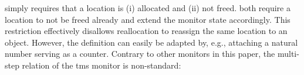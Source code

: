 \documentclass[dvipsnames]{llncs}
\begin{document}
\begin{center}\small
  $\;$\\
\end{center}
% 
 simply requires that a location is (i) allocated and (ii) not freed.
 both require a location to not be freed already and extend the monitor state accordingly.
This restriction effectively disallows reallocation to reassign the same location to an object.
However, the definition can easily be adapted by, e.g., attaching a natural number serving as a counter.
Contrary to other monitors in this paper, the multi-step relation of the \gls*{tms} monitor is non-standard:
\begin{center}
  $\;$\\
\end{center}
\end{document}
